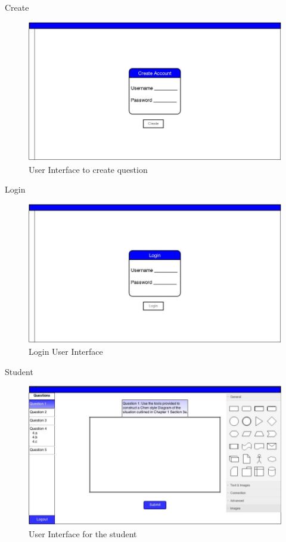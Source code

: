     \begin{section}{Create}
        \begin{figure}[h!]
                \centerline{\includegraphics[width=13cm]{UICreate.jpg}}
                \caption{User Interface to create question}
        \end{figure}
    \end{section}
    \newpage
    \begin{section}{Login}
        \begin{figure}[h!]
                \centerline{\includegraphics[width=13cm]{UILogin.jpg}}
                \caption{Login User Interface}
        \end{figure}
        \end{section}
        \newpage
        \begin{section}{Student}
        \begin{figure}[h!]
                \centerline{\includegraphics[width=13cm]{uistudent.jpg}}
                \caption{User Interface for the student}
        \end{figure}
  
    \end{section}

      \fi


